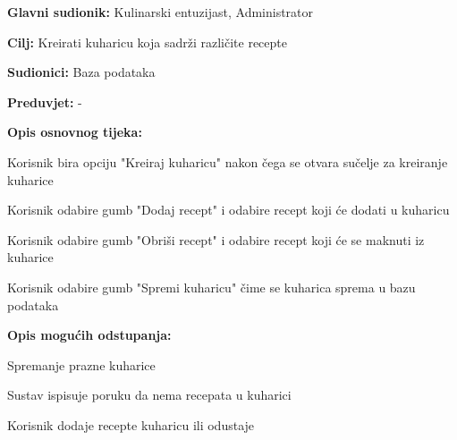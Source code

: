 					\noindent {}
					\begin{packed_item}
	
						\item \textbf{Glavni sudionik: } Kulinarski entuzijast, Administrator 
						\item  \textbf{Cilj:} Kreirati kuharicu koja sadrži različite recepte
						\item  \textbf{Sudionici:} Baza podataka
						\item  \textbf{Preduvjet:} -
						\item  \textbf{Opis osnovnog tijeka:} 
						
						\item[] \begin{packed_enum}
	
						\item Korisnik bira opciju "Kreiraj kuharicu" nakon čega se otvara sučelje za kreiranje kuharice
						\item Korisnik odabire gumb "Dodaj recept" i odabire recept koji će dodati u kuharicu				
						\item Korisnik odabire gumb "Obriši recept" i odabire recept koji će se maknuti iz kuharice
						\item Korisnik odabire gumb "Spremi kuharicu" čime se kuharica sprema u bazu podataka
						\end{packed_enum}
						
						\item  \textbf{Opis mogućih odstupanja:}
						
						\item[] \begin{packed_item}
	
							\item[2.a] Spremanje prazne kuharice
							\item[] \begin{packed_enum}
								
								\item Sustav ispisuje poruku da nema recepata u kuharici
								\item Korisnik dodaje recepte kuharicu ili odustaje
								
							\end{packed_enum}							


						\end{packed_item}
					\end{packed_item}


